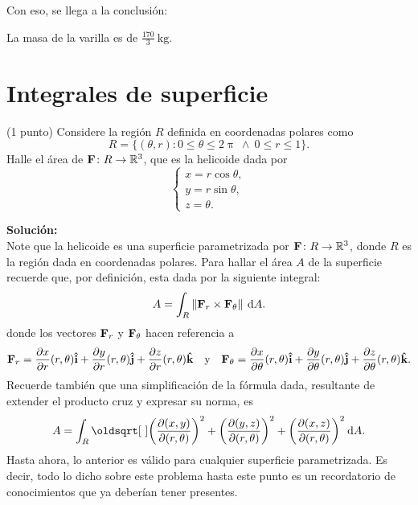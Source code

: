 \documentclass{fmbvecto}
\begin{document}
\begin{problema}
Con eso, se llega a la conclusión:
\begin{gbox}
    La masa de la varilla es de \(\frac{170}{3} \: \text{kg}\).
\end{gbox}
\end{problema}


\section{Integrales de superficie}

\begin{problema}
    
    (1 punto) Considere la región \(R\) definida en coordenadas polares como \[R = \{(\theta, r) \colon 0 \leq \theta \leq 2\uppi \ \land \ 0 \leq r \leq 1\}.\] Halle el área de \(\boldsymbol{{\mathbf{F}}}\colon R\to \mathbb{R}^3\), que es la helicoide dada por \[\begin{cases}
        x = r\cos\theta, \\
        y = r\sin\theta, \\
        z = \theta.
    \end{cases}\]

\tcblower
\textbf{Solución:}\\

Note que la helicoide es una superficie parametrizada por \(\boldsymbol{{\mathbf{F}}}\colon R \to \mathbb{R}^3\), donde \(R\) es la región dada en coordenadas polares. Para hallar el área \(A\) de la superficie recuerde que, por definición, esta dada por la siguiente integral:
\[A = \int_{R} \left\lVert \boldsymbol{{\mathbf{F}}}_r \times \boldsymbol{{\mathbf{F}}}_\theta \right\rVert \: \mathrm{d}A.\]
donde los vectores \(\boldsymbol{{\mathbf{F}}}_r\) y \(\boldsymbol{{\mathbf{F}}}_\theta\) hacen referencia a
\[\bvec{F}_r = \parder[x][r](r, \theta) \uvec{i} + \parder[y][r](r, \theta) \uvec{j} + \parder[z][r](r, \theta) \uvec{k} \quad \text{y} \quad \bvec{F}_\theta = \parder[x][\theta](r, \theta) \uvec{i} + \parder[y][\theta](r, \theta) \uvec{j} + \parder[z][\theta](r, \theta) \uvec{k}.\]
Recuerde también que una simplificación de la fórmula dada, resultante de extender el producto cruz y expresar su norma, es
\[A = \int_{R} \sqrt{\left(\parder[(x, y)][(r, \theta)]\right)^2 + \left(\parder[(y, z)][(r, \theta)]\right)^2 + \left(\parder[(x, z)][(r, \theta)]\right)^2} \: \mathrm{d}A.\]
Hasta ahora, lo anterior es válido para cualquier superficie parametrizada. Es decir, todo lo dicho sobre este problema hasta este punto es un recordatorio de conocimientos que ya deberían tener presentes. \\


\end{problema}
\end{document}
